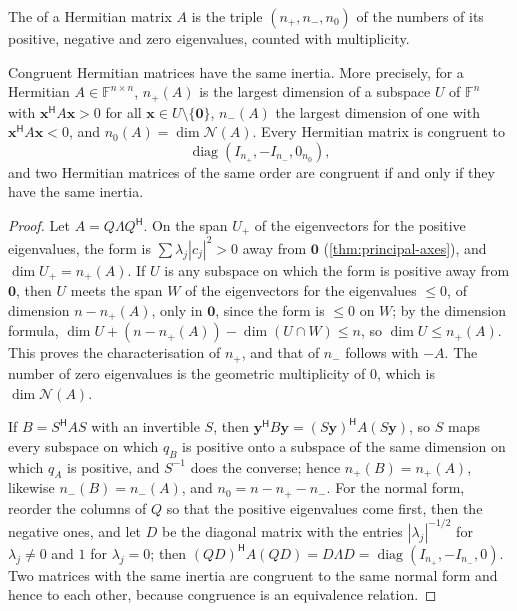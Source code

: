 \begin{definition}[Inertia]
\label{def:inertia}
The  of a Hermitian matrix $A$ is the triple $(n_+,n_-,n_0)$ of the numbers of its positive, negative and zero eigenvalues, counted with multiplicity.
\end{definition}

\begin{theorem}
\label{thm:inertia}
Congruent Hermitian matrices have the same inertia. More precisely, for a Hermitian $A\in\mathbb F^{n\times n}$, $n_+(A)$ is the largest dimension of a subspace $U$ of $\mathbb F^n$ with $\mathbf x^{\mathsf H}A\mathbf x>0$ for all $\mathbf x\in U\setminus\{\mathbf 0\}$, $n_-(A)$ the largest dimension of one with $\mathbf x^{\mathsf H}A\mathbf x<0$, and $n_0(A)=\dim\mathcal N(A)$. Every Hermitian matrix is congruent to
\[
\operatorname{diag}(I_{n_+},-I_{n_-},0_{n_0}),
\]
and two Hermitian matrices of the same order are congruent if and only if they have the same inertia.
\end{theorem}

\begin{proof}
Let $A=Q\Lambda Q^{\mathsf H}$. On the span $U_+$ of the eigenvectors for the positive eigenvalues, the form is $\sum\lambda_j|c_j|^2>0$ away from $\mathbf 0$ (\cref{thm:principal-axes}), and $\dim U_+=n_+(A)$. If $U$ is any subspace on which the form is positive away from $\mathbf 0$, then $U$ meets the span $W$ of the eigenvectors for the eigenvalues $\le0$, of dimension $n-n_+(A)$, only in $\mathbf 0$, since the form is $\le0$ on $W$; by the dimension formula, $\dim U+(n-n_+(A))-\dim(U\cap W)\le n$, so $\dim U\le n_+(A)$. This proves the characterisation of $n_+$, and that of $n_-$ follows with $-A$. The number of zero eigenvalues is the geometric multiplicity of $0$, which is $\dim\mathcal N(A)$.

If $B=S^{\mathsf H}AS$ with an invertible $S$, then $\mathbf y^{\mathsf H}B\mathbf y=(S\mathbf y)^{\mathsf H}A(S\mathbf y)$, so $S$ maps every subspace on which $q_B$ is positive onto a subspace of the same dimension on which $q_A$ is positive, and $S^{-1}$ does the converse; hence $n_+(B)=n_+(A)$, likewise $n_-(B)=n_-(A)$, and $n_0=n-n_+-n_-$. For the normal form, reorder the columns of $Q$ so that the positive eigenvalues come first, then the negative ones, and let $D$ be the diagonal matrix with the entries $|\lambda_j|^{-1/2}$ for $\lambda_j\ne0$ and $1$ for $\lambda_j=0$; then $(QD)^{\mathsf H}A(QD)=D\Lambda D=\operatorname{diag}(I_{n_+},-I_{n_-},0)$. Two matrices with the same inertia are congruent to the same normal form and hence to each other, because congruence is an equivalence relation.
\end{proof}

